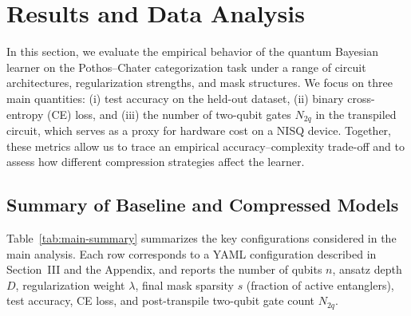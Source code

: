 \documentclass[conference]{IEEEtran}
\begin{document}
\section{Results and Data Analysis}
\label{sec:results}

In this section, we evaluate the empirical behavior of the quantum Bayesian learner on
the Pothos--Chater categorization task under a range of circuit architectures,
regularization strengths, and mask structures. We focus on three main
quantities: (i) test accuracy on the held-out dataset, (ii) binary
cross-entropy (CE) loss, and (iii) the number of two-qubit gates $N_{2q}$ in
the transpiled circuit, which serves as a proxy for hardware cost on a NISQ
device. Together, these metrics allow us to trace an empirical
accuracy--complexity trade-off and to assess how different compression
strategies affect the learner.

\subsection{Summary of Baseline and Compressed Models}

Table~\ref{tab:main-summary} summarizes the key configurations considered in
the main analysis. Each row corresponds to a YAML configuration described in
Section~III and the Appendix, and reports the number of qubits $n$, ansatz
depth $D$, regularization weight $\lambda$, final mask sparsity $s$ (fraction
of active entanglers), test accuracy, CE loss, and post-transpile two-qubit
gate count $N_{2q}$.
\end{document}
